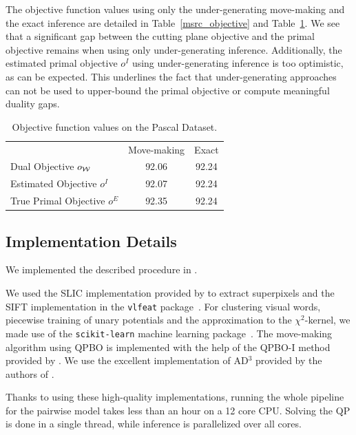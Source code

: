 The objective function values using only the under-generating move-making and
the exact inference are detailed in Table~\ref{msrc_objective} and Table~\ref{pascal_objective}.
We see that a significant gap between the cutting plane objective and the primal objective
remains when using only under-generating inference.
Additionally, the estimated primal objective $o^I$ using under-generating inference is
too optimistic, as can be expected. This underlines the fact that
under-generating approaches can not be used to upper-bound the primal
objective or compute meaningful duality gaps.

\begin{table}
    \begin{center}
    \begin{tabularx}{\linewidth}{@{\extracolsep{\fill}}lcc}
    \toprule
                    & Move-making & Exact \\
    \cmidrule{1-3}
    Dual Objective $o_{\mathcal{W}}$ &92.06& 92.24\\
    Estimated Objective $o^I$ & 92.07 &92.24\\
    True Primal Objective $o^E$&92.35& 92.24  \\
    \bottomrule
    \end{tabularx}
    \end{center}
    \caption{Objective function values on the Pascal Dataset.}
    \label{pascal_objective}
\end{table}


\subsection{Implementation Details}
We implemented the described procedure in \pystruct.

We used the SLIC implementation provided by \citet{achanta2012slic} to extract superpixels and
the SIFT implementation in the \texttt{vlfeat} package~\citep{vedaldi08vlfeat}.
For clustering visual words, piecewise training of unary potentials and the
approximation to the $\chi^2$-kernel, we made use of the \texttt{scikit-learn}
machine learning package~\citep{pedregosa2011scikit}.
The move-making algorithm using QPBO is implemented with the help of the QPBO-I
method provided by \citet{rother2007optimizing}.
We use the excellent implementation of AD$^3$ provided by the authors of
\citet{martins2011augmented}. 

Thanks to using these high-quality implementations, running the whole pipeline
for the pairwise model takes less than an hour on a 12 core CPU\@. Solving the
QP is done in a single thread, while inference is parallelized over all cores.
 
